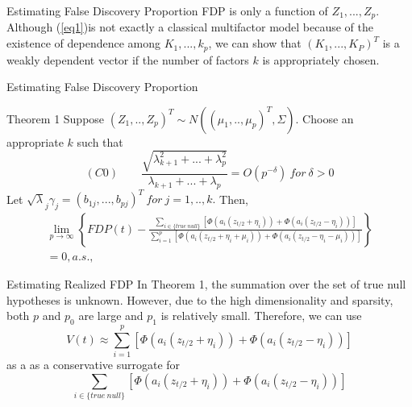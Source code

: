 \documentclass{beamer}
\begin{document}
\begin{frame}[t]{Estimating False Discovery Proportion}\vspace{10pt}
FDP is only a function of $Z_1,...,Z_p$. Although (\ref{eq1})is not exactly a classical multifactor model because of the existence of dependence among $K_1,...,k_p$, we can show that $(K_1,...,K_P)^T$ is a weakly dependent vector if the number of factors $k$ is appropriately chosen.


\end{frame} 
\begin{frame}[t]{Estimating False Discovery Proportion}\vspace{10pt}
\begin{block}{Theorem 1} 
Suppose	$(Z_1,..,Z_p)^T \sim N((\mu_1,..,\mu_p)^T,\Sigma)$. Choose an appropriate $k$ such that 
$$ (C0) \qquad \frac{\sqrt{\lambda^2_{k+1}+...+\lambda^2_{p}}}{\lambda_{k+1}+...+\lambda_{p}} = O(p^{-\delta}) \ for \ \delta > 0$$ 
Let $\sqrt\lambda_j\gamma_j= (b_{1j},...,b_{pj})^T \ for \ j=1,..,k.$ Then,
\small {
\begin{multline}\label{eq2}
\lim_{p \rightarrow \infty} \left\{FDP(t)-\frac{\sum_{i \in \{true \ null\}}[\Phi(a_i(z_{t/2}+\eta_i))+\Phi(a_i(z_{t/2}-\eta_i))]}{\sum_{i =1}^{p}[\Phi(a_i(z_{t/2}+\eta_i+\mu_i))+\Phi(a_i(z_{t/2}-\eta_i-\mu_i))]}\right\} \\
= 0, a.s.,
\end{multline}
}

\end{block}
\end{frame} 


\begin{frame}[t]{Estimating Realized FDP}\vspace{10pt}
In Theorem 1, the summation over the set of true null hypotheses is unknown. However, due to the high dimensionality and sparsity, both $p$ and $p_0$ are large and $p_1$ is relatively small. Therefore, we can use
$$ V(t) \approx \sum_{i=1}^p\left[\Phi(a_i(z_{t/2}+\eta_i))+\Phi(a_i(z_{t/2}-\eta_i))  \right] $$
as a as a conservative surrogate for
$$ \sum_{i \in \{true \ null\}}\left[\Phi(a_i(z_{t/2}+\eta_i))+\Phi(a_i(z_{t/2}-\eta_i))  \right] $$



\end{frame}
\end{document}
